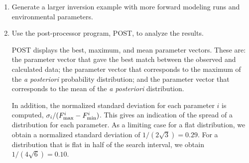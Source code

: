 \documentclass{saclantc}
\begin{document}
\begin{enumerate}
\item Generate a larger inversion example with more forward modeling runs
and environmental parameters. 
\item Use the post-processor program, {\sf POST}, to analyze the results.

{\sf POST} displays the best, maximum, and mean parameter
vectors. These are: the parameter vector that gave the best match
between the observed and calculated data; the parameter vector that
corresponds to the maximum of the {\it a posteriori } probability
distribution; and the parameter vector that corresponds to the mean of
the {\it a posteriori } distribution.  

In addition, the normalized
standard deviation for each parameter $i$ is computed, $ \sigma_i/ (F^i_{\rm max} - F^i_{\rm
min}) $. This gives an indication of the spread of a distribution for
each parameter. As a limiting case for a flat distribution, we obtain a
normalized standard deviation of $1/(2\sqrt{3})=0.29$. For a
distribution that is flat in half of the search interval, we obtain
$1/(4\sqrt{6})=0.10$.


\end{enumerate}
\end{document}
